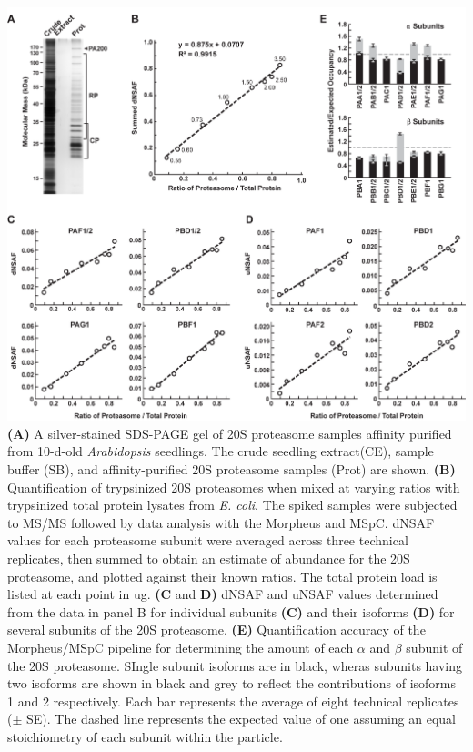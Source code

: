 \begin{FPfigure}
	\centering
	\includegraphics[width=\columnwidth]{MSpC/figure2_rescale.png}
	{\textbf{(A)} A silver-stained SDS-PAGE gel of 20S proteasome samples affinity purified from 10-d-old \textit{Arabidopsis} seedlings. The crude seedling extract(CE), sample buffer (SB), and affinity-purified 20S proteasome samples (Prot) are shown. \textbf{(B)} Quantification of trypsinized 20S proteasomes when mixed at varying ratios with trypsinized total protein lysates from \textit{E. coli}. The spiked samples were subjected to MS/MS followed by data analysis with the Morpheus and MSpC. dNSAF values for each proteasome subunit were averaged across three technical replicates, then summed to obtain an estimate of abundance for the 20S proteasome, and plotted against their known ratios. The total protein load is listed at each point in ug. \textbf{(C} and \textbf{D)} dNSAF and uNSAF values determined from the data in panel B for individual subunits \textbf{(C)} and their isoforms \textbf{(D)} for several subunits of the 20S proteasome. \textbf{(E)} Quantification accuracy of the Morpheus/MSpC pipeline for determining the amount of each $\alpha$ and $\beta$ subunit of the 20S proteasome. SIngle subunit isoforms are in black, wheras subunits having two isoforms are shown in black and grey to reflect the contributions of isoforms 1 and 2 respectively. Each bar represents the average of eight technical replicates ($\pm$ SE). The dashed line represents the expected value of one assuming an equal stoichiometry of each subunit within the particle.}
	\label{fig:proteasomespike}
\end{FPfigure}
